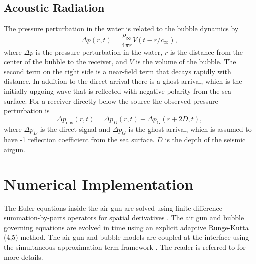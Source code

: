 \documentclass[10pt]{article}
\begin{document}
\subsection{Acoustic Radiation}
The pressure perturbation in the water is related to the bubble dynamics by \citep{Keller1956}
\begin{equation}
\Delta p(r,t) = \frac{\rho_\infty}{4\pi r} {\ddot{V}(t-r/c_\infty)},
\label{eq:acoustic radiation}
\end{equation}
where $\Delta p$ is the pressure perturbation in the water, $r$ is the distance from the center of the bubble to the receiver, and $V$ is the volume of the bubble. The second term on the right side is a near-field term that decays rapidly with distance. In addition to the direct arrival there is a ghost arrival, which is the initially upgoing wave that is reflected with negative polarity from the sea surface. For a receiver directly below the source the observed pressure perturbation is
\begin{equation}
\Delta p_\text{obs}(r,t) = \Delta p_D(r,t) - \Delta p_G(r+2D,t),
\end{equation}
where $\Delta p_D$ is the direct signal and $\Delta p_G$ is the ghost arrival, which is assumed to have -1 reflection coefficient from the sea surface. $D$ is the depth of the seismic airgun.

\section{Numerical Implementation}
The Euler equations inside the air gun are solved using finite difference summation-by-parts operators for spatial derivatives \citep{Svard2014}. The air gun and bubble governing equations are evolved in time using an explicit adaptive Runge-Kutta (4,5) method. The air gun and bubble models are coupled at the interface using the simultaneous-approximation-term framework \citep{Carpenter1994,DelReyFernandez2014a,Svard2014}.
The reader is referred to \citet{Watson2019_airgun} for more details.



\newpage


\end{document}
